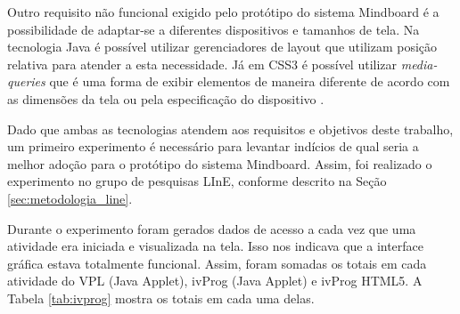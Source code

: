 Outro requisito não funcional exigido pelo protótipo do sistema Mindboard é a possibilidade de adaptar-se a diferentes dispositivos e tamanhos de tela. Na tecnologia Java é possível utilizar gerenciadores de layout que utilizam posição relativa para atender a esta necessidade. Já em CSS3 é possível utilizar \emph{media-queries} que é uma forma de exibir elementos de maneira diferente de acordo com as dimensões da tela ou pela especificação do dispositivo \cite{css3_media_query}.

Dado que ambas as tecnologias atendem aos requisitos e objetivos deste trabalho, um primeiro experimento é necessário para levantar indícios de qual seria a melhor adoção para o protótipo do sistema Mindboard. Assim, foi realizado o experimento no grupo de pesquisas LInE, conforme descrito na Seção \ref{sec:metodologia_line}.

Durante o experimento foram gerados dados de acesso a cada vez que uma atividade era iniciada e visualizada na tela. Isso nos indicava que a interface gráfica estava totalmente funcional. Assim, foram somadas os totais em cada atividade do VPL (Java Applet), ivProg (Java Applet) e ivProg HTML5. A Tabela \ref{tab:ivprog} mostra os totais em cada uma delas.

